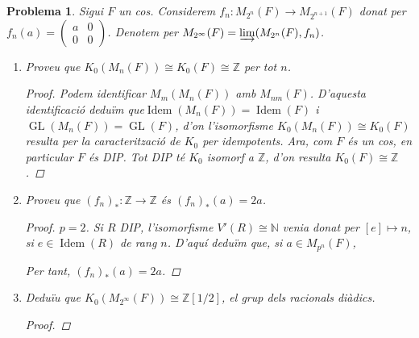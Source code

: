 \documentclass[compress]{article}
\newtheorem{problema}{Problema}
\theoremstyle{definition}
\DeclareMathOperator{\Idem}{Idem}
\DeclareMathOperator{\GL}{GL}
\begin{document}
\begin{problema}
    Sigui $F$ un cos. Considerem $f_{n}:M_{2^{n}}(F)\rightarrow M_{2^{n+1}}(F)$ donat per $f_{n}(a)=\left(\begin{smallmatrix}a&0\\0&0\end{smallmatrix}\right)$. Denotem per $M_{2^{\infty}}(F)=\varinjlim(M_{2^{n}}(F),f_{n})$.
    \begin{enumerate}
        \item Proveu que $K_{0}(M_{n}(F))\cong K_{0}(F)\cong\mathbb{Z}$ per tot $n$.
        \begin{proof}
            Podem identificar $M_{m}(M_{n}(F))$ amb $M_{nm}(F)$. D'aquesta identificació deduïm que\newline$\Idem(M_{n}(F))=\Idem(F)$ i $\GL(M_{n}(F))=\GL(F)$, d'on l'isomorfisme $K_{0}(M_{n}(F))\cong K_{0}(F)$ resulta per la caracterització de $K_{0}$ per idempotents. Ara, com $F$ és un cos, en particular $F$ és DIP. Tot DIP té $K_{0}$ isomorf a $\mathbb{Z}$, d'on resulta $K_{0}(F)\cong\mathbb{Z}$.
        \end{proof}
        \item Proveu que $(f_{n})_{*}:\mathbb{Z}\rightarrow\mathbb{Z}$ és $(f_{n})_{*}(a)=2a$.
        \begin{proof}
            $p=2$. Si $R$ DIP, l'isomorfisme $V'(R)\cong\mathbb{N}$ venia donat per $[e]\mapsto n$, si $e\in\Idem(R)$ de rang $n$. D'aquí deduïm que, si $a\in M_{p^{n}}(F)$,
            \begin{center}
            \end{center}
            Per tant, $(f_{n})_{*}(a)=2a$.
        \end{proof}
        \item Deduïu que $K_{0}(M_{2^{\infty}}(F))\cong\mathbb{Z}[1/2]$, el grup dels racionals diàdics. 
        \begin{proof}

\end{proof}
\end{enumerate}
\end{problema}
\end{document}
